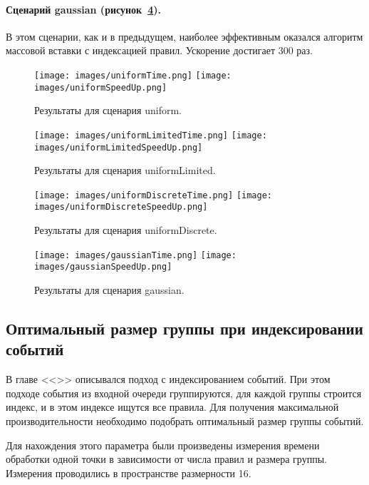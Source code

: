 \documentclass[14pt]{article}
\begin{document}
\paragraph{Сценарий gaussian (рисунок~\ref{fig:gaussian}).} В этом сценарии, как и в предыдущем, наиболее эффективным оказался алгоритм массовой вставки с индексацией правил. Ускорение достигает 300 раз.

\begin{figure}[p]
    \centering
    \texttt{[image: images/uniformTime.png]}    \texttt{[image: images/uniformSpeedUp.png]}
    \caption{Результаты для сценария uniform.}
    \label{fig:uniform}
\end{figure}
\begin{figure}[p]
    \centering
    \texttt{[image: images/uniformLimitedTime.png]}    \texttt{[image: images/uniformLimitedSpeedUp.png]}
    \caption{Результаты для сценария uniformLimited.}
    \label{fig:uniformLimited}
\end{figure}
\begin{figure}[p]
    \centering
    \texttt{[image: images/uniformDiscreteTime.png]}    \texttt{[image: images/uniformDiscreteSpeedUp.png]}
    \caption{Результаты для сценария uniformDiscrete.}
    \label{fig:uniformDiscrete}
\end{figure}
\begin{figure}[p]
    \centering
    \texttt{[image: images/gaussianTime.png]}    \texttt{[image: images/gaussianSpeedUp.png]}
    \caption{Результаты для сценария gaussian.}
    \label{fig:gaussian}
\end{figure}

\subsection{Оптимальный размер группы при индексировании событий}
В главе <<>> описывался подход с индексированием событий. При этом подходе события из входной очереди группируются, для каждой группы строится индекс, и в этом индексе ищутся все правила. Для получения максимальной производительности необходимо подобрать оптимальный размер группы событий.

Для нахождения этого параметра были произведены измерения времени обработки одной точки в зависимости от числа правил и размера группы. Измерения проводились в пространстве размерности 16.
\end{document}
